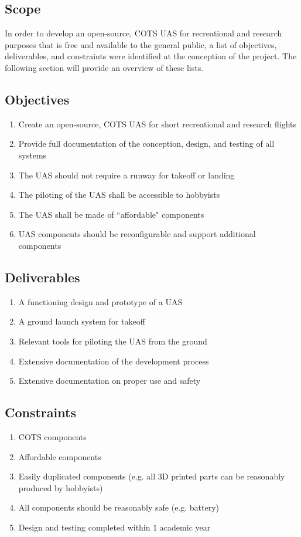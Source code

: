 \documentclass{article}
\begin{document}
\subsection{Scope}
In order to develop an open-source, COTS UAS for recreational and research purposes that is free and available to the general public, a list of objectives, deliverables, and constraints were identified at the conception of the project. The following section will provide an overview of these lists.

\subsection{Objectives}
\begin{enumerate}
\item Create an open-source, COTS UAS for short recreational and research flights
\item Provide full documentation of the conception, design, and testing of all systems
\item The UAS should not require a runway for takeoff or landing
\item The piloting of the UAS shall be accessible to hobbyists
\item The UAS shall be made of ``affordable" components
\item UAS components should be reconfigurable and support additional components
\end{enumerate}

\subsection{Deliverables}
\begin{enumerate}
\item A functioning design and prototype of a UAS
\item A ground launch system for takeoff
\item Relevant tools for piloting the UAS from the ground
\item Extensive documentation of the development process
\item Extensive documentation on proper use and safety
\end{enumerate}

\subsection{Constraints}
\begin{enumerate}
\item COTS components
\item Affordable components
\item Easily duplicated components (e.g. all 3D printed parts can be reasonably produced by hobbyists)
\item All components should be reasonably safe (e.g. battery)
\item Design and testing completed within 1 academic year
\end{enumerate}
\end{document}
